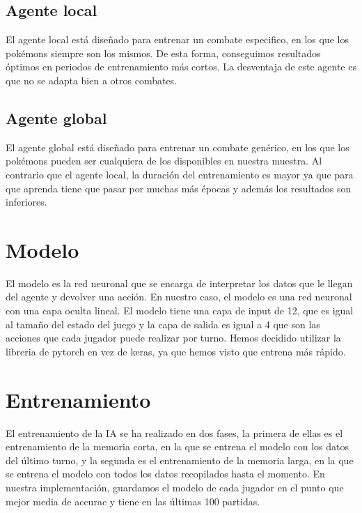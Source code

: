 \subsection{Agente local}

El agente local está diseñado para entrenar un combate especifico, en los que los pokémons siempre son los mismos. De esta forma, conseguimos resultados óptimos en periodos de entrenamiento más cortos. La desventaja de este agente es que no se adapta bien a otros combates. 

\subsection{Agente global}

El agente global está diseñado para entrenar un combate genérico, en los que los pokémons pueden ser cualquiera de los disponibles en nuestra muestra. Al contrario que el agente local, la duración del entrenamiento es mayor ya que para que aprenda tiene que pasar por muchas más épocas y además los resultados son inferiores.

\section{Modelo}

El modelo es la red neuronal que se encarga de interpretar los datos que le llegan del agente y devolver una acción. En nuestro caso, el modelo es una red neuronal con una capa oculta lineal. El modelo tiene una capa de input de 12, que es igual al tamaño del estado del juego y la capa de salida es igual a 4 que son las acciones que cada jugador puede realizar por turno. Hemos decidido utilizar la libreria de pytorch en vez de keras, ya que hemos visto que entrena más rápido.

\section{Entrenamiento}

El entrenamiento de la IA se ha realizado en dos fases, la primera de ellas es el entrenamiento de la memoria corta, en la que se entrena el modelo con los datos del último turno, y la segunda es el entrenamiento de la memoria larga, en la que se entrena el modelo con todos los datos recopilados hasta el momento. En nuestra implementación, guardamos el modelo de cada jugador en el punto que mejor media de accurac
y tiene en las últimas 100 partidas.

